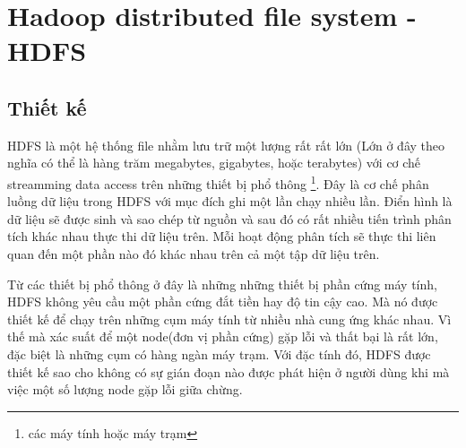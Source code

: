 \section{Hadoop distributed file system - HDFS}
\subsection{Thiết kế}
HDFS là một hệ thống file nhằm lưu trữ một lượng rất rất lớn (Lớn ở đây theo nghĩa có thể là hàng trăm megabytes, gigabytes, hoặc terabytes) với cơ chế streamming data access trên những thiết bị phổ thông \footnote{các máy tính hoặc máy trạm}.
 Đây là cơ chế phân luồng dữ liệu trong HDFS với mục đích ghi một lần chạy nhiều lần. Điển hình là dữ liệu sẽ được sinh và sao chép từ nguồn và sau đó có rất nhiều tiến trình phân tích khác nhau thực thi dữ liệu trên. Mỗi hoạt động phân tích sẽ thực thi liên quan đến một phần nào đó khác nhau trên cả một tập dữ liệu trên.\par
 Từ các thiết bị phổ thông ở đây là những những thiết bị phần cứng máy tính, HDFS không yêu cầu một phần cứng đắt tiền hay độ tin cậy cao. Mà nó được thiết kế để chạy trên những cụm máy tính từ nhiều nhà cung ứng khác nhau. Vì thế mà xác suất để một node(đơn vị phần cứng) gặp lỗi và thất bại là rất lớn, đặc biệt là những cụm có hàng ngàn máy trạm. Với đặc tính đó, HDFS được thiết kế sao cho không có sự gián đoạn nào được phát hiện ở người dùng khi mà việc một số lượng node gặp lỗi giữa chừng.\par
